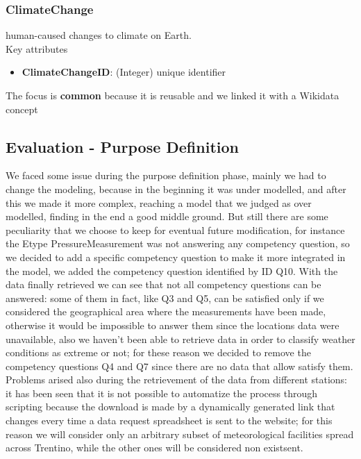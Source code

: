 \subsubsection{ClimateChange}
human-caused changes to climate on Earth.\\
Key attributes
\begin{itemize}
    \item \textbf{ClimateChangeID}: (Integer)  unique identifier
\end{itemize}
The focus is \textbf{common} because it is reusable and we linked it with a Wikidata concept

\subsection{Evaluation - Purpose Definition}
We faced some issue during the purpose definition phase, mainly we had to change the modeling, because in the beginning
it was under modelled, and after this we made it more complex, reaching a model that we judged as over modelled, finding in the end a good middle ground. But still there are some peculiarity that we choose to keep for eventual future modification,
for instance the Etype PressureMeasurement was not answering any competency question, so we decided to add a specific
competency question to make it more integrated in the model, we added the competency question identified by ID Q10.
With the data finally retrieved we can see that not all competency questions can be answered: some of them in fact, like Q3 and Q5, can be satisfied only if we considered the geographical area where the measurements have been made, otherwise it would be impossible to answer them since the locations data were unavailable, also we haven't been able to retrieve data in order to classify weather conditions as extreme or not; for these reason we decided to remove the competency questions Q4 and Q7 since there are no data that allow satisfy them. Problems arised also during the retrievement of the data from different stations: it has been seen that it is not possible to automatize the process through scripting because the download is made by a dynamically generated link that changes every time a data request spreadsheet is sent to the website; for this reason we will consider only an arbitrary subset of meteorological facilities spread across Trentino, while the other ones will be considered non existsent. 
